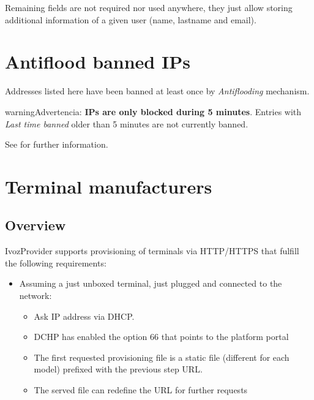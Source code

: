 \documentclass[letterpaper,10pt,spanish]{sphinxmanual}
\begin{document}
Remaining fields are not required nor used anywhere, they just allow storing additional information of a given user
(name, lastname and email).


\section{Antiflood banned IPs}
\label{administration_portal/platform/antiflood_banned_ips:antiflood-banned-ips}\label{administration_portal/platform/antiflood_banned_ips::doc}\label{administration_portal/platform/antiflood_banned_ips:id1}
Addresses listed here have been banned at least once by \emph{Antiflooding} mechanism.

\begin{notice}{warning}{Advertencia:}
\textbf{IPs are only blocked during 5 minutes}. Entries with \emph{Last time banned} older than 5 minutes are not
currently banned.
\end{notice}

See {\hyperref[security_and_maintenance/security/antiflooding:sip\string-antiflooding]{}} for further information.


\section{Terminal manufacturers}
\label{administration_portal/platform/terminal_manufacturers:terminal-manufacturers}\label{administration_portal/platform/terminal_manufacturers::doc}\label{administration_portal/platform/terminal_manufacturers:provisioning}

\subsection{Overview}
\label{administration_portal/platform/terminal_manufacturers:overview}
IvozProvider supports provisioning of terminals via HTTP/HTTPS that fulfill the
following requirements:
\begin{itemize}
\item {} 
Assuming a just unboxed terminal, just plugged and connected to the network:
\begin{itemize}
\item {} 
Ask IP address via DHCP.

\item {} 
DCHP has enabled the option 66 that points to the platform portal

\item {} 
The first requested provisioning file is a static file (different for each
model) prefixed with the previous step URL.

\item {} 
The served file can redefine the URL for further requests

\end{itemize}

\end{itemize}
\end{document}
